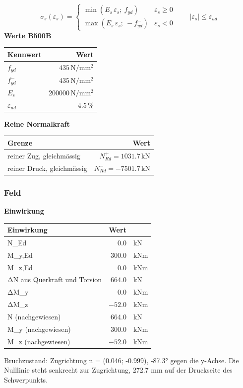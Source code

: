 \documentclass[11pt,a4paper]{article}
\begin{document}
\begin{equation*}
\sigma_s(\varepsilon_s) = \begin{cases} \min(E_s\,\varepsilon_s;\ f_{yd}) & \varepsilon_s \ge 0 \\[1ex] \max(E_s\,\varepsilon_s;\ -f_{yd}^{-}) & \varepsilon_s < 0 \end{cases} \qquad |\varepsilon_s| \le \varepsilon_{ud}
\end{equation*}
\noindent\textbf{Werte B500B}
\begin{longtable}{lr}
\hline
Kennwert & Wert \\
\hline
\endhead
$f_{yd}$ & $435\,\mathrm{N}/\mathrm{mm}^{2}$ \\
$f_{yd}^{-}$ & $435\,\mathrm{N}/\mathrm{mm}^{2}$ \\
$E_s$ & $200000\,\mathrm{N}/\mathrm{mm}^{2}$ \\
$\varepsilon_{ud}$ & $4.5\,\%$ \\
\hline
\end{longtable}
\noindent\textbf{Reine Normalkraft}
\begin{longtable}{lr}
\hline
Grenze & Wert \\
\hline
\endhead
reiner Zug, gleichmässig & $N_{Rd}^{+} = 1031.7\,\mathrm{kN}$ \\
reiner Druck, gleichmässig & $N_{Rd}^{-} = -7501.7\,\mathrm{kN}$ \\
\hline
\end{longtable}
\subsubsection{Feld}
\noindent\textbf{Einwirkung}
\begin{longtable}{lrl}
\hline
Einwirkung & Wert &  \\
\hline
\endhead
N\_Ed & $0.0$ & kN \\
M\_y,Ed & $300.0$ & kNm \\
M\_z,Ed & $0.0$ & kNm \\
ΔN aus Querkraft und Torsion & $664.0$ & kN \\
ΔM\_y & $0.0$ & kNm \\
ΔM\_z & $-52.0$ & kNm \\
N (nachgewiesen) & $664.0$ & kN \\
M\_y (nachgewiesen) & $300.0$ & kNm \\
M\_z (nachgewiesen) & $-52.0$ & kNm \\
\hline
\end{longtable}
Bruchzustand: Zugrichtung n = (0.046; -0.999), -87.3° gegen die y-Achse. Die Nulllinie steht senkrecht zur Zugrichtung, 272.7 mm auf der Druckseite des Schwerpunkts.
\end{document}
